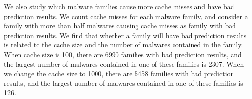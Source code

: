 {\color{red}
We also study which malware families cause more cache misses 
and have bad prediction results. 
We count cache misses for each malware family, 
and consider a family with more than half malwares causing cache misses as family with bad prediction results. 
We find that whether a family will have bad prediction results is related to the cache size and the number of malwares contained in the family. 
When cache size is 100, there are 6990 families with bad prediction results, 
and the largest number of malwares contained in one of these families is 2307. 
When we change the cache size to 1000, 
there are 5458 families with bad prediction results, 
and the largest number of malwares contained in one of these families is 126. 
}

